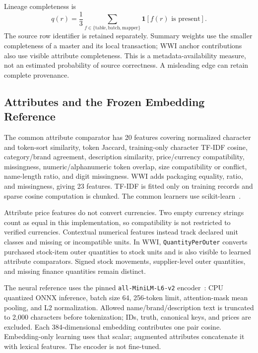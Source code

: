 \documentclass[conference,letterpaper]{IEEEtran}
\newcommand{\ind}{\mathbf{1}}
\begin{document}
Lineage completeness is
\begin{equation}
q(r)=\frac{1}{3}\sum_{f\in\{\mathrm{table},\mathrm{batch},\mathrm{mapper}\}}
\ind[f(r)\text{ is present}].
\label{eq:lineage}
\end{equation}
The source row identifier is retained separately. Summary weights use the smaller completeness of a master and its local transaction; WWI anchor contributions also use visible attribute completeness. This is a metadata-availability measure, not an estimated probability of source correctness. A misleading edge can retain complete provenance.

\subsection{Attributes and the Frozen Embedding Reference}
The common attribute comparator has 20 features covering normalized character and token-sort similarity, token Jaccard, training-only character TF-IDF cosine, category/brand agreement, description similarity, price/currency compatibility, missingness, numeric/alphanumeric token overlap, size compatibility or conflict, name-length ratio, and digit missingness. WWI adds packaging equality, ratio, and missingness, giving 23 features. TF-IDF is fitted only on training records and sparse cosine computation is chunked. The common learners use scikit-learn~\cite{sklearn2011}.

Attribute price features do not convert currencies. Two empty currency strings count as equal in this implementation, so compatibility is not restricted to verified currencies. Contextual numerical features instead track declared unit classes and missing or incompatible units. In WWI, \texttt{QuantityPerOuter} converts purchased stock-item outer quantities to stock units and is also visible to learned attribute comparators. Signed stock movements, supplier-level outer quantities, and missing finance quantities remain distinct.

The neural reference uses the pinned \texttt{all-MiniLM-L6-v2} encoder~\cite{minilmcard}: CPU quantized ONNX inference, batch size 64, 256-token limit, attention-mask mean pooling, and L2 normalization. Allowed name/brand/description text is truncated to 2,000 characters before tokenization; IDs, truth, canonical keys, and prices are excluded. Each 384-dimensional embedding contributes one pair cosine. Embedding-only learning uses that scalar; augmented attributes concatenate it with lexical features. The encoder is not fine-tuned.
\end{document}
